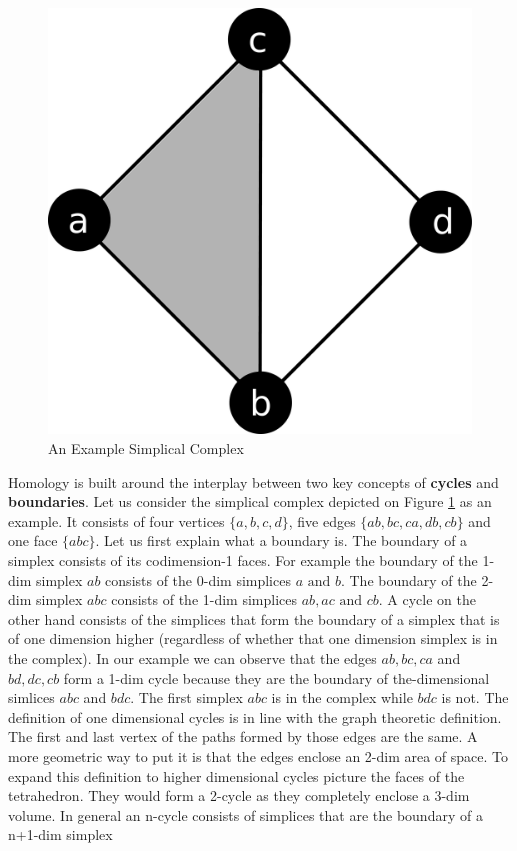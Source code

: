 \begin{figure}[h]%
    \centering
    \includegraphics[scale=0.08]{./images/simplex/complex-romb.pdf}%
    \caption{An Example Simplical Complex}%
    \label{fig:hom-sc}%
\end{figure}

Homology is built around the interplay between two key concepts of \textbf{cycles} and \textbf{boundaries}. Let us consider the simplical complex depicted on Figure \ref{fig:hom-sc} as an example. It consists of four vertices $\{a, b, c, d\}$, five edges $\{ab, bc, ca, db, cb\}$ and one face $\{abc\}$. Let us first explain what a boundary is. The boundary of a simplex consists of its codimension-1 faces. For example the boundary of the 1-dim simplex $ab$ consists of the 0-dim simplices $a \text{ and } b$. The boundary of the 2-dim simplex $abc$ consists of the 1-dim simplices $ab, ac \text{ and } cb$. A cycle on the other hand consists of the simplices that form the boundary of a simplex that is of one dimension higher (regardless of whether that one dimension simplex is in the complex). In our example we can observe that the edges $ab, bc, ca$ and $bd, dc, cb$ form a 1-dim cycle because they are the boundary of the-dimensional simlices $abc$ and $bdc$. The first simplex $abc$ is in the complex while $bdc$ is not. The definition of one dimensional cycles is in line with the graph theoretic definition. The first and last vertex of the paths formed by those edges are the same. A more geometric way to put it is that the edges enclose an 2-dim area of space. To expand this definition to higher dimensional cycles picture the faces of the tetrahedron. They would form a 2-cycle as they completely enclose a 3-dim volume. In general an n-cycle consists of simplices that are the boundary of a n+1-dim simplex



